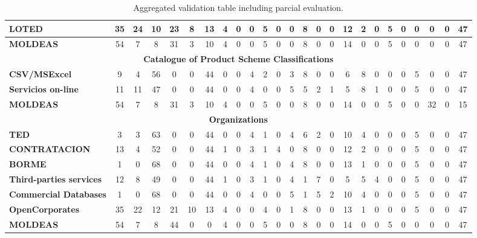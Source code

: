 \begin{table*}[t]
\begin{center}
\begin{tabular}{|p{2cm}||c|c|c||c|c|c||c|c|c||c|c|c||c|c|c||c|c|c||c|c|c||c|c|c|}
 \textbf{LOTED}	     		& 35 & 24 & 10 	& 23 & 8 & 13  	& 4 & 0 & 0  & 5 & 0 & 0  & 8 & 0 & 0  & 12 & 2 & 0  	& 5 & 0 & 0  & 0 & 0 & 47 \\ \hline 
 \textbf{MOLDEAS}	     	& 54 & 7 & 8  	& 31 & 3 & 10 	& 4 & 0 & 0  & 5 & 0 & 0  & 8 & 0 & 0  & 14 & 0 & 0 	& 5 & 0 & 0  & 0 & 0 & 47 \\ \hline 
 \multicolumn{25}{|c|}{\textbf{Catalogue of Product Scheme Classifications}} \\ \hline
 \textbf{CSV/MSExcel} 		& 9 & 4 & 56 & 0 & 0 & 44 & 0 & 0 & 4 & 2 & 0 & 3 & 8 & 0 & 0 & 6 & 8 & 0 & 0 & 0 & 5 & 0 & 0 & 47 \\ \hline 
 \textbf{Servicios on-line} 	& 11 & 11 & 47 & 0 & 0 & 44 & 0 & 0 & 4 & 0 & 0 & 5 & 5 & 2 & 1 & 5 & 8 & 1 & 0 & 0 & 5 & 0 & 0 & 47 \\ \hline 
 \textbf{MOLDEAS}		& 54 & 7 & 8 & 31 & 3 & 10 & 4 & 0 & 0 & 5 & 0 & 0 & 8 & 0 & 0 & 14 & 0 & 0 & 5 & 0 & 0 & 32 & 0 & 15 \\ \hline 
 \multicolumn{25}{|c|}{\textbf{Organizations}} \\ \hline
 \textbf{TED} 			&  3 & 3 & 63 & 0 & 0 & 44 & 0 & 0 & 4 & 1 & 0 & 4 & 6 & 2 & 0 & 10 & 4 & 0 & 0 & 0 & 5 & 0 & 0 & 47 \\ \hline 
 \textbf{CONTRATACION} &    13 & 4 & 52 & 0 & 0 & 44 & 1 & 0 & 3 & 1 & 4 & 0 & 8 & 0 & 0 & 12 & 2 & 0 & 0 & 0 & 5 & 0 & 0 & 47 \\ \hline 
 \textbf{BORME}			&    1 & 0 & 68 & 0 & 0 & 44 & 0 & 0 & 4 & 1 & 0 & 4 & 8 & 0 & 0 & 13 & 1 & 0 & 0 & 0 & 5 & 0 & 0 & 47 \\ \hline 
 \textbf{Third-parties services} 	&  12 & 8 & 49 & 0 & 0 & 44 & 1 & 0 & 3 & 1 & 0 & 4 & 1 & 7 & 0 & 5 & 5 & 4 & 0 & 0 & 5 & 0 & 0 & 47 \\ \hline 
 \textbf{Commercial Databases} &     1 & 0 & 68 & 0 & 0 & 44 & 0 & 0 & 4 & 0 & 0 & 5 & 1 & 5 & 2 & 10 & 4 & 0 & 0 & 0 & 5 & 0 & 0 & 47 \\ \hline 
 \textbf{OpenCorporates} 	&    35 & 22 & 12 & 21 & 10 & 13 & 4 & 0 & 0 & 4 & 0 & 1 & 8 & 0 & 0 & 13 & 1 & 0 & 0 & 0 & 5 & 0 & 0 & 47 \\ \hline 
 \textbf{MOLDEAS} 		&    54 & 7 & 8 & 44 & 0 & 0 & 4 & 0 & 0 & 5 & 0 & 0 & 8 & 0 & 0 & 14 & 0 & 0 & 5 & 0 & 0 & 0 & 0 & 47 \\ \hline 
\hline
  \end{tabular}
  \caption{Aggregated validation table including parcial evaluation.}
  \label{tabla:agregado-full}
  \end{center}
\end{table*} 




